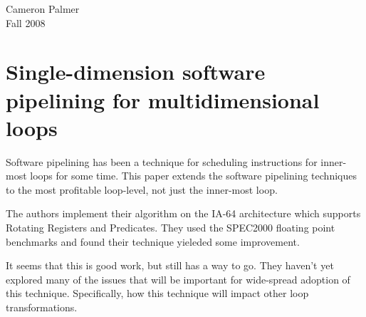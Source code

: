 \documentclass[12pt,twoside,letterpaper]{article}
\begin{document}
Cameron Palmer \\
Fall 2008

\section*{Single-dimension software pipelining for multidimensional loops}

Software pipelining has been a technique for scheduling instructions for inner-most loops for some time. This paper extends the software pipelining techniques to the most profitable loop-level, not just the inner-most loop.

The authors implement their algorithm on the IA-64 architecture which supports Rotating Registers and Predicates. They used the SPEC2000 floating point benchmarks and found their technique yieleded some improvement.

It seems that this is good work, but still has a way to go. They haven't yet explored many of the issues that will be important for wide-spread adoption of this technique. Specifically, how this technique will impact other loop transformations.
\end{document}
